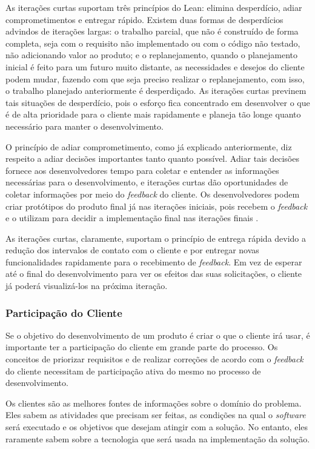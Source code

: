 As iterações curtas suportam três princípios do Lean: elimina desperdício, adiar comprometimentos e entregar rápido. Existem duas formas de desperdícios advindos de iterações largas: o trabalho parcial, que não é construído de forma completa, seja com o requisito não implementado ou com o código não testado, não adicionando valor ao produto; e o replanejamento, quando o planejamento inicial é feito para um futuro muito distante, as necessidades e desejos do cliente podem mudar, fazendo com que seja preciso realizar o replanejamento, com isso, o trabalho planejado anteriormente é desperdiçado. As iterações curtas previnem tais situações de desperdício, pois o esforço fica concentrado em desenvolver o que é de alta prioridade para o cliente mais rapidamente e planeja tão longe quanto necessário para manter o desenvolvimento.  

O princípio de adiar comprometimento, como já explicado anteriormente, diz respeito a adiar decisões importantes tanto quanto possível. Adiar tais decisões fornece aos desenvolvedores tempo para coletar e entender as informações necessárias para o desenvolvimento, e iterações curtas dão oportunidades de coletar informações por meio do \textit{feedback} do cliente. Os desenvolvedores podem criar protótipos do produto final já nas iterações iniciais, pois recebem o \textit{feedback} e o utilizam para decidir a implementação final nas iterações finais \cite{hibbs2009}.

As iterações curtas, claramente, suportam o princípio de entrega rápida devido a redução dos intervalos de contato com o cliente e por entregar novas funcionalidades rapidamente para o recebimento de \textit{feedback}. Em vez de esperar até o final do desenvolvimento para ver os efeitos das suas solicitações, o cliente já poderá visualizá-los na próxima iteração. 

\subsubsection[Participação do Cliente]{Participação do Cliente}

Se o objetivo do desenvolvimento de um produto é criar o que o cliente irá usar, é importante ter a participação do cliente em grande parte do processo. Os conceitos de priorizar requisitos e de realizar correções de acordo com o \textit{feedback} do cliente necessitam de participação ativa do mesmo no processo de desenvolvimento. 

Os clientes são as melhores fontes de informações sobre o domínio do problema. Eles sabem as atividades que precisam ser feitas, as condições na qual o \textit{software} será executado e os objetivos que desejam atingir com a solução. No entanto, eles raramente sabem sobre a tecnologia que será usada na implementação da solução. 

